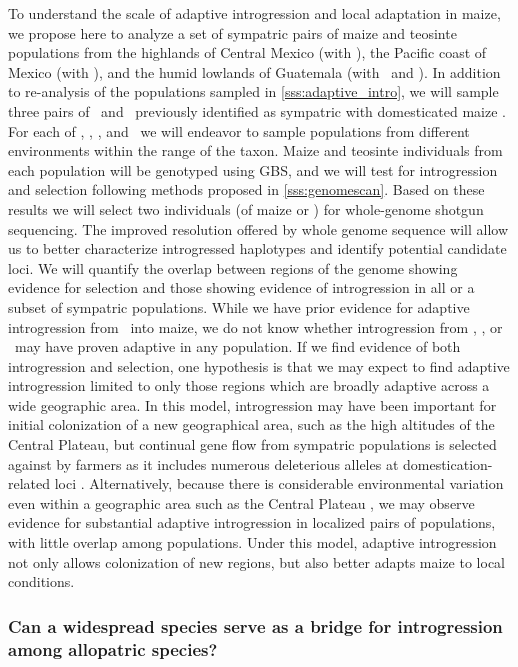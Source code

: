 To understand the scale of adaptive introgression and local adaptation in maize, we propose here to analyze a set of sympatric pairs of maize and teosinte populations from the highlands of Central Mexico (with \zm), the Pacific coast of Mexico (with \zp), and the humid lowlands of Guatemala (with \zl\ and \zh). 
In addition to re-analysis of the populations sampled in \ref{sss:adaptive_intro}, we will sample three pairs of \zm\ and \zp\ previously identified as sympatric with domesticated maize \citep{hufford2010genetic, Hufford2013}.  
For each of \zl, \zm, \zp, and \zh\ we will endeavor to sample populations from different environments within the range of the taxon.
Maize and teosinte individuals from each population will be genotyped using GBS, and we will test for introgression and selection following methods proposed in \ref{sss:genomescan}.
Based on these results we will select two individuals (of maize or \zm) for whole-genome shotgun sequencing. 
The improved resolution offered by whole genome sequence will allow us to better characterize introgressed haplotypes and identify potential candidate loci.
We will quantify the overlap between regions of the genome showing evidence for selection and those showing evidence of introgression in all or a subset of sympatric populations.  
While we have prior evidence for adaptive introgression from \zm\ into maize, we do not know whether introgression from \zp, \zl, or \zh\ may have proven adaptive in any population.
If we find evidence of both introgression and selection, one hypothesis is that we may expect to find adaptive introgression limited to only those regions which are broadly adaptive across a wide geographic area. 
In this model, introgression may have been important for initial colonization of a new geographical area, such as the high altitudes of the Central Plateau, but continual gene flow from sympatric populations is selected against by farmers as it includes numerous deleterious alleles at domestication-related loci \citep[c.f.][]{Hufford2013}.
Alternatively, because there is considerable environmental variation even within a geographic area such as the Central Plateau \citep{hufford2012inferences, Pyhajarvi2013}, we may observe evidence for substantial adaptive introgression in localized pairs of populations, with little overlap among populations. 
Under this model, adaptive introgression not only allows colonization of new regions, but also better adapts maize to local conditions.


\subsubsection{Can a widespread species serve as a bridge for introgression among allopatric species?}
\label{sss:bridge}

